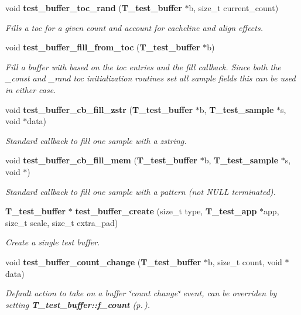 \begin{CompactItemize}
void {\bf test\_\-buffer\_\-toc\_\-rand} ({\bf T\_\-test\_\-buffer} $\ast$b, size\_\-t current\_\-count)
\begin{CompactList}\small\item\em Fills a toc for a given count and account for cacheline and align effects.\item\end{CompactList}\item 
void {\bf test\_\-buffer\_\-fill\_\-from\_\-toc} ({\bf T\_\-test\_\-buffer} $\ast$b)
\begin{CompactList}\small\item\em Fill a buffer with based on the toc entries and the fill callback. Since both the \_\-const and \_\-rand toc initialization routines set all sample fields this can be used in either case.\item\end{CompactList}\item 
void {\bf test\_\-buffer\_\-cb\_\-fill\_\-zstr} ({\bf T\_\-test\_\-buffer} $\ast$b, {\bf T\_\-test\_\-sample} $\ast$s, void $\ast$data)
\begin{CompactList}\small\item\em Standard callback to fill one sample with a zstring.\item\end{CompactList}\item 
void {\bf test\_\-buffer\_\-cb\_\-fill\_\-mem} ({\bf T\_\-test\_\-buffer} $\ast$b, {\bf T\_\-test\_\-sample} $\ast$s, void $\ast$)
\begin{CompactList}\small\item\em Standard callback to fill one sample with a pattern (not NULL terminated).\item\end{CompactList}\item 
{\bf T\_\-test\_\-buffer} $\ast$ {\bf test\_\-buffer\_\-create} (size\_\-t type, {\bf T\_\-test\_\-app} $\ast$app, size\_\-t scale, size\_\-t extra\_\-pad)
\begin{CompactList}\small\item\em Create a single test buffer.\item\end{CompactList}\item 
void {\bf test\_\-buffer\_\-count\_\-change} ({\bf T\_\-test\_\-buffer} $\ast$b, size\_\-t count, void $\ast$data)
\begin{CompactList}\small\item\em Default action to take on a buffer \char`\"{}count change\char`\"{} event, can be overriden by setting {\bf T\_\-test\_\-buffer::f\_\-count} {\rm (p.\,\pageref{structT__test__buffer_m22})}.\item\end{CompactList}\item 

\end{CompactItemize}
